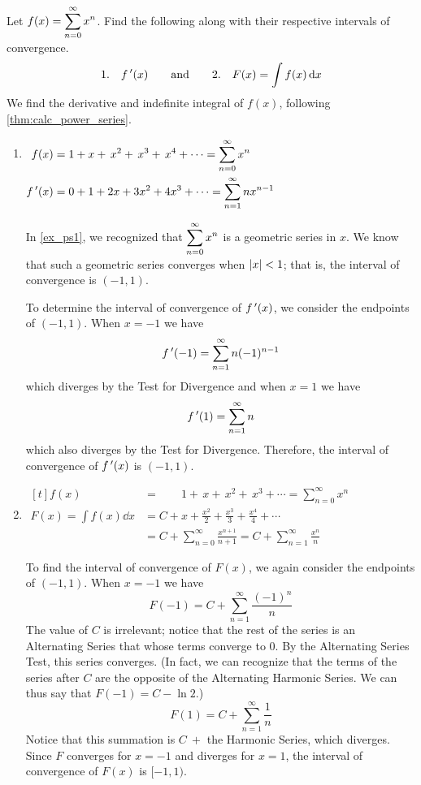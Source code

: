 \begin{example}\label{ex_ps3}%
Let $\displaystyle f(x) = \sum_{n=0}^\infty x^n$. Find the following along with their respective intervals of convergence.
\[
 \text{1.}\quad f\,'(x)
 \qquad\text{and}\qquad
 \text{2.}\quad\displaystyle F(x) =\int f(x)\operatorname{d}\! x
\]
\solution
We find the derivative and indefinite integral of $f(x)$, following \autoref{thm:calc_power_series}.

\begin{enumerate}
\item\hfill$\begin{aligned}[t]
f(x)&=1+x+\,x^2+\,x^3+\,x^4+\dotsb = \sum_{n=0}^\infty x^n\\
f\,'(x) &= 0+1+2x+3x^2+4x^3+\dotsb=\sum_{n=1}^\infty nx^{n-1} 
\end{aligned}$\hfill\null

In \autoref{ex_ps1}, we recognized that $\displaystyle \sum_{n=0}^\infty x^n$ is a geometric series in $x$. We know that such a geometric series converges when $\left\lvert x \right\rvert<1$; that is, the interval of convergence is $(-1,1)$.

To determine the interval of convergence of $f\,'(x)$, we consider the endpoints of $(-1,1)$.
When $x=-1$ we have
\[f\,'(-1) = \sum_{n=1}^\infty n(-1)^{n-1}\]
which diverges by the Test for Divergence
and when $x=1$ we have
\[f\,'(1) = \sum_{n=1}^\infty n\]
which also diverges by the Test for Divergence. Therefore, the interval of convergence of $f\,'(x)$ is $(-1,1)$. 

\item\hfill$\begin{aligned}[t]
 f(x)&=\phantom{C+{}}1+\,x+\,x^2+\,x^3+\dotsb = \sum_{n=0}^\infty x^n\\
 F(x) = \int f(x)\dd x &= C+ x+\frac{x^2}{2}+\frac{x^3}3+\frac{x^4}4+\dotsb \\
 &= C+\sum_{n=0}^\infty \frac{x^{n+1}}{n+1}=C+\sum_{n=1}^\infty \frac{x^{n}}{n}  
\end{aligned}$\hfill\null

To find the interval of convergence of $F(x)$, we again consider the endpoints of $(-1,1)$.
When $x=-1$ we have
\[F(-1) = C+\sum_{n=1}^\infty \frac{(-1)^{n}}{n}\]
The value of $C$ is irrelevant; notice that the rest of the series is an Alternating Series that whose terms converge to 0. By the Alternating Series Test, this series converges. (In fact, we can recognize that the terms of the series after $C$ are the opposite of the Alternating Harmonic Series. We can thus say that $F(-1) = C-\ln 2$.)
\[F(1) = C+\sum_{n=1}^\infty \frac{1}{n} \]
Notice that this summation is $C\ +$ the Harmonic Series, which diverges. Since $F$ converges for $x=-1$ and diverges for $x=1$, the interval of convergence of $F(x)$ is $[-1,1)$.
\end{enumerate}
\end{example}


